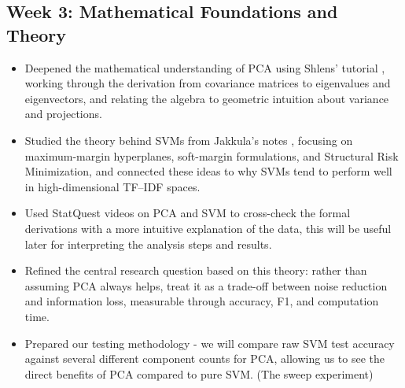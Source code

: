 \documentclass[runningheads]{llncs}
\begin{document}
\subsection*{Week 3: Mathematical Foundations and Theory}
\begin{itemize}
  \item Deepened the mathematical understanding of PCA using Shlens' tutorial \cite{shlens2014tutorial}, working through the derivation from covariance matrices to eigenvalues and eigenvectors, and relating the algebra to geometric intuition about variance and projections.
  \item Studied the theory behind SVMs from Jakkula's notes \cite{jakkula2011svm}, focusing on maximum-margin hyperplanes, soft-margin formulations, and Structural Risk Minimization, and connected these ideas to why SVMs tend to perform well in high-dimensional TF--IDF spaces.
  \item Used StatQuest videos on PCA and SVM \cite{starmer2017pca,starmer2018svm1,starmer2018svm2,starmer2018svm3} to cross-check the formal derivations with a more intuitive explanation of the data, this will be useful later for interpreting the analysis steps and results. 
  \item Refined the central research question based on this theory: rather than assuming PCA always helps, treat it as a trade-off between noise reduction and information loss, measurable through accuracy, F1, and computation time.
  \item Prepared our testing methodology - we will compare raw SVM test accuracy against several different component counts for PCA, allowing us to see the direct benefits of PCA compared to pure SVM. (The sweep experiment)
\end{itemize}
\end{document}
